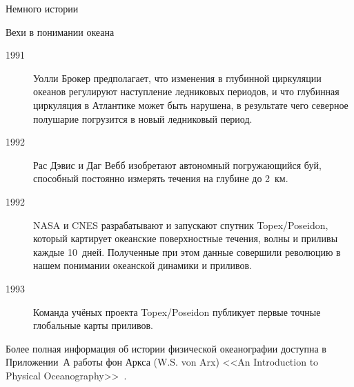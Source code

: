 \begin{chapter}{Немного истории}
\begin{section}{Вехи в понимании океана}
\begin{description}
\item[1991] Уолли Брокер предполагает, что изменения в глубинной
циркуляции океанов регулируют наступление ледниковых периодов, и что
глубинная циркуляция в Атлантике может быть нарушена, в результате чего
северное полушарие погрузится в новый ледниковый период.
%

\item[1992] Рас Дэвис и Даг Вебб изобретают автономный погружающийся
буй, способный постоянно измерять течения на глубине до 2~км.
%

\item[1992] NASA и CNES разрабатывают и запускают спутник Topex/Poseidon,
который картирует океанские поверхностные течения, волны и приливы каждые 
10~дней. Полученные при этом данные совершили революцию в нашем понимании
океанской динамики и приливов.
%

\item[1993] Команда учёных проекта Topex/Poseidon публикует первые точные
глобальные карты приливов.
%
\end{description}

Более полная информация об истории физической океанографии доступна
в Приложении~А работы фон Аркса (W.S. von Arx) <<An Introduction
to Physical Oceanography>>~\cite{vonArx:1962}.
%


\end{section}
\end{chapter}
